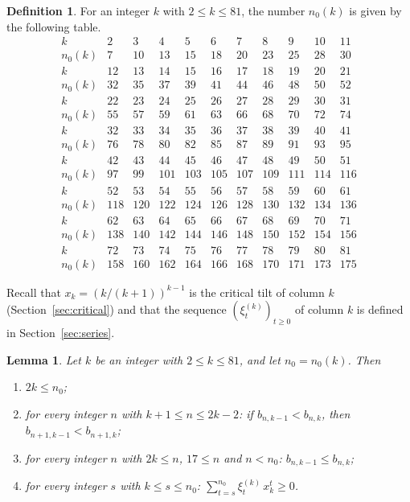 \documentclass{amsart}
\newtheorem{lemma}[theorem]{Lemma}
\theoremstyle{definition}
\newtheorem{definition}[theorem]{Definition}
\theoremstyle{remark}
\numberwithin{equation}{section}
\begin{document}
\begin{definition}\label{def:startrow}
For an integer $k$ with $2\le k\le 81$, the number $n_0(k)$ is given by the following table.
\[
\begin{array}{c|cccccccccc}
k & 2 & 3 & 4 & 5 & 6 & 7 & 8 & 9 & 10 & 11\\
n_0(k) & 7 & 10 & 13 & 15 & 18 & 20 & 23 & 25 & 28 & 30\\ \hline
k & 12 & 13 & 14 & 15 & 16 & 17 & 18 & 19 & 20 & 21\\
n_0(k) & 32 & 35 & 37 & 39 & 41 & 44 & 46 & 48 & 50 & 52\\ \hline
k & 22 & 23 & 24 & 25 & 26 & 27 & 28 & 29 & 30 & 31\\
n_0(k) & 55 & 57 & 59 & 61 & 63 & 66 & 68 & 70 & 72 & 74\\ \hline
k & 32 & 33 & 34 & 35 & 36 & 37 & 38 & 39 & 40 & 41\\
n_0(k) & 76 & 78 & 80 & 82 & 85 & 87 & 89 & 91 & 93 & 95\\ \hline
k & 42 & 43 & 44 & 45 & 46 & 47 & 48 & 49 & 50 & 51\\
n_0(k) & 97 & 99 & 101 & 103 & 105 & 107 & 109 & 111 & 114 & 116\\ \hline
k & 52 & 53 & 54 & 55 & 56 & 57 & 58 & 59 & 60 & 61\\
n_0(k) & 118 & 120 & 122 & 124 & 126 & 128 & 130 & 132 & 134 & 136\\ \hline
k & 62 & 63 & 64 & 65 & 66 & 67 & 68 & 69 & 70 & 71\\
n_0(k) & 138 & 140 & 142 & 144 & 146 & 148 & 150 & 152 & 154 & 156\\ \hline
k & 72 & 73 & 74 & 75 & 76 & 77 & 78 & 79 & 80 & 81\\
n_0(k) & 158 & 160 & 162 & 164 & 166 & 168 & 170 & 171 & 173 & 175
\end{array}
\]
\end{definition}

Recall that $x_k=(k/(k+1))^{k-1}$ is the critical tilt of column $k$ (Section~\ref{sec:critical}) and that the sequence $(\xi^{(k)}_t)_{t\ge 0}$ of column $k$ is defined in Section~\ref{sec:series}.

\begin{lemma}\label{lem:columntable}
Let $k$ be an integer with $2\le k\le 81$, and let $n_0=n_0(k)$. Then
\begin{enumerate}
\item $2k\le n_0$;
\item for every integer $n$ with $k+1\le n\le 2k-2$: if $b_{n,k-1}<b_{n,k}$, then $b_{n+1,k-1}<b_{n+1,k}$;
\item for every integer $n$ with $2k\le n$, $17\le n$ and $n<n_0$: $b_{n,k-1}\le b_{n,k}$;
\item for every integer $s$ with $k\le s\le n_0$: $\sum_{t=s}^{n_0}\xi^{(k)}_t\,x_k^{t}\ge 0$.
\end{enumerate}
\end{lemma}
\end{document}
